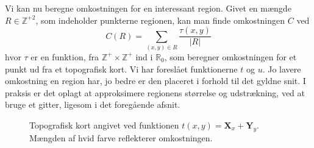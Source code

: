 {Vi kan nu beregne omkostningen for en interessant region. Givet en
mængde $R \in \mathbb{Z}^{+2}$, som indeholder punkterne regionen, kan
man finde omkostningen $C$ ved
\begin{equation}
    C(R) = \sum_{(x, y) \in R}{\frac{\tau(x, y)}{|R|}}
\end{equation}
hvor $\tau$ er en funktion, fra $\mathbb{Z}^{+}\times\mathbb{Z}^{+}$ ind
i $\mathbb{R}_0$, som beregner omkostningen for et punkt ud fra et
topografisk kort. Vi har foreslået funktionerne $t$ og $u$. Jo lavere
omkostning en region har, jo bedre er den placeret i forhold til det
gyldne snit. I praksis er det oplagt at approksimere regionens størrelse
og udstrækning, ved at bruge et gitter, ligesom i det foregående afsnit.

\begin{figure}[h]
    \setlength\fboxsep{0pt}
    \setlength\fboxrule{0.5pt}
    \begin{center}
    \end{center}
    \caption[]{Topografisk kort angivet ved funktionen $t(x, y) =
    \mathbf{X}_x + \mathbf{Y}_y$. Mængden af hvid farve reflekterer
    omkostningen.}
    \label{topography_plus}
\end{figure}

}
